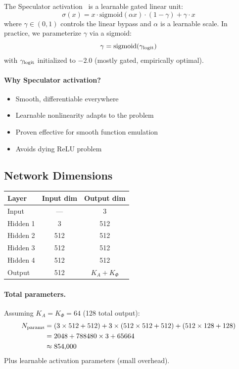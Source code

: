 \documentclass[11pt,a4paper]{article}
\begin{document}
The Speculator activation~\cite{speculator} is a learnable gated linear unit:
\begin{equation}
    \boxed{\sigma(x) = x \cdot \text{sigmoid}(\alpha x) \cdot (1 - \gamma) + \gamma \cdot x}
    \label{eq:speculator}
\end{equation}
where $\gamma \in (0, 1)$ controls the linear bypass and $\alpha$ is a learnable scale. In practice, we parameterize $\gamma$ via a sigmoid:
\begin{equation}
    \gamma = \text{sigmoid}(\gamma_{\rm logit})
\end{equation}
with $\gamma_{\rm logit}$ initialized to $-2.0$ (mostly gated, empirically optimal).

\paragraph{Why Speculator activation?}
\begin{itemize}
    \item Smooth, differentiable everywhere
    \item Learnable nonlinearity adapts to the problem
    \item Proven effective for smooth function emulation
    \item Avoids dying ReLU problem
\end{itemize}

\subsection{Network Dimensions}

\begin{center}
\begin{tabular}{lcc}
\toprule
Layer & Input dim & Output dim \\
\midrule
Input & --- & 3 \\
Hidden 1 & 3 & 512 \\
Hidden 2 & 512 & 512 \\
Hidden 3 & 512 & 512 \\
Hidden 4 & 512 & 512 \\
Output & 512 & $K_A + K_\Phi$ \\
\bottomrule
\end{tabular}
\end{center}

\paragraph{Total parameters.}
Assuming $K_A = K_\Phi = 64$ (128 total output):
\begin{align}
    N_{\rm params} &= (3 \times 512 + 512) + 3 \times (512 \times 512 + 512) + (512 \times 128 + 128) \\
    &= 2048 + 788480 \times 3 + 65664 \\
    &\approx 854,\!000
\end{align}
Plus learnable activation parameters (small overhead).
\end{document}
